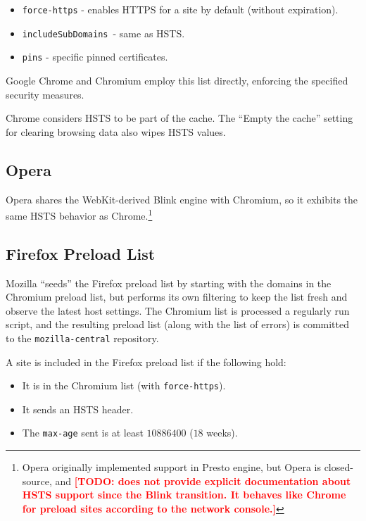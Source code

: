 \documentclass[conference]{./IEEEtran}
\newcommand{\todo}[1]{\textcolor{red}{\textbf{[TODO: #1]}}}
\newcommand{\code}[1]{\texttt{#1}}
\newcommand{\iSD}{{\code{includeSubDomains}}}
\theoremstyle{plain}
\begin{document}
\begin{itemize}
\item \code{force-https} - enables HTTPS for a site by default (without expiration).
\item \iSD~- same as HSTS.
\item \code{pins} - specific pinned certificates.
\end{itemize}

Google Chrome and Chromium employ this list directly, enforcing the specified security measures.

Chrome considers HSTS to be part of the cache. The ``Empty the cache'' setting for clearing browsing data also wipes HSTS values.

\subsection{Opera}

Opera shares the WebKit-derived Blink engine with Chromium, so it exhibits the same HSTS behavior as Chrome.\footnote{Opera originally implemented support in Presto engine\cite{opera}, but Opera is closed-source, and \todo{does not provide explicit documentation about HSTS support since the Blink transition. It behaves like Chrome for preload sites according to the network console.}}

\subsection{Firefox Preload List}

Mozilla ``seeds'' the Firefox preload list by starting with the domains in the Chromium preload list, but performs its own filtering to keep the list fresh and observe the latest host settings. The Chromium list is processed a regularly run\cite{firefox-cron}\cite{firefox-cron-script} script\cite{firefox-script}, and the resulting preload list\cite{firefox-list} (along with the list of errors\cite{firefox-errors}) is committed to the \code{mozilla-central} repository.

A site is included in the Firefox preload list if the following hold:

\begin{itemize}
\item It is in the Chromium list (with \code{force-https}).
\item It sends an HSTS header.
\item The \code{max-age} sent is at least $10886400$ ($18$ weeks).
\end{itemize}
\end{document}
